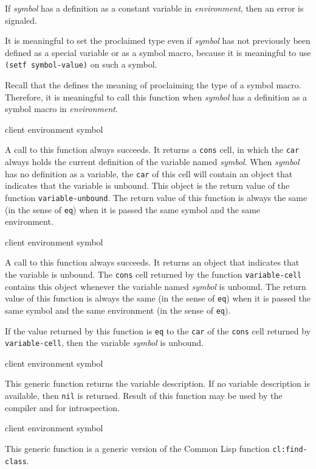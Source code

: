 If \textit{symbol} has a definition as a constant variable in
\textit{environment}, then an error is signaled.

It is meaningful to set the proclaimed type even if \textit{symbol}
has not previously been defined as a special variable or as a symbol
macro, because it is meaningful to use \texttt{(setf symbol-value)} on
such a symbol.

Recall that the \hs{} defines the meaning of proclaiming the type of a
symbol macro.  Therefore, it is meaningful to call this function when
\textit{symbol} has a definition as a symbol macro in
\textit{environment}.

 {client environment symbol}

A call to this function always succeeds.  It returns a \texttt{cons}
cell, in which the \texttt{car} always holds the current definition of
the variable named \textit{symbol}.  When \textit{symbol} has no
definition as a variable, the \texttt{car} of this cell will contain
an object that indicates that the variable is unbound.  This object is
the return value of the function \texttt{variable-unbound}.  The
return value of this function is always the same (in the sense of
\texttt{eq}) when it is passed the same symbol and the same
environment.

 {client environment symbol}

A call to this function always succeeds.  It returns an object that indicates
that the variable is unbound.  The \texttt{cons} cell returned by the function
\texttt{variable-cell} contains this object whenever the variable named
\textit{symbol} is unbound.  The return value of this function is always the
same (in the sense of \texttt{eq}) when it is passed the same symbol and the
same environment (in the sense of \texttt{eq}).

If the value returned by this function is \texttt{eq} to the \texttt{car} of
the \texttt{cons} cell returned by \texttt{variable-cell}, then the variable
\textit{symbol} is unbound.

 {client environment symbol}

This generic function returns the variable description. If no variable
description is available, then \texttt{nil} is returned. Result of this
function may be used by the compiler and for introspection.

 {client environment symbol}

This generic function is a generic version of the Common Lisp function
\texttt{cl:find-class}.

